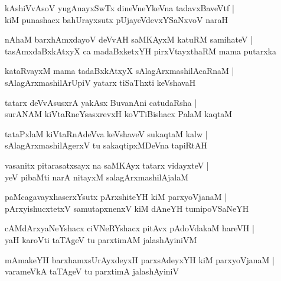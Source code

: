 \documentclass[twoside,12pt,openright]{book}
\newcounter{shloka}[chapter]
\begin{document}
\begin{shloka}%
kAshiVvAsoV yugAnayxSwTx dineVneYkeVna tadavxBaveVtf |\\
kiM punashacx bahUrayxsutx pUjayeVdevxYSaNxvoV naraH 
\end{shloka}

\begin{shloka}%
nAhaM barxhAmxdayoV deVvAH saMKAyxM katuRM samihateV |\\
tasAmxdaBxkAtxyX ca madaBxketxYH pirxVtayxthaRM mama putarxka
\end{shloka}

\begin{shloka}%
kataRvayxM mama tadaBxkAtxyX sAlagArxmashilAcaRnaM |\\
sAlagArxmashilArUpiV yatarx tiSaThxti keVshavaH 
\end{shloka}

\begin{shloka}%
tatarx deVvAsusxrA yakAsx BuvanAni catudaRsha |\\
surANAM kiVtaRneYsasxrevxH koVTiBishacx PalaM kaqtaM 
\end{shloka}

\begin{shloka}%
tataPxlaM kiVtaRnAdeVva keVshaveV sukaqtaM kalw |\\
sAlagArxmashilAgerxV tu sakaqtipxMDeVna tapiRtAH 
\end{shloka}

\begin{shloka}%
vasanitx pitarasatxsayx na saMKAyx tatarx vidayxteV |\\
yeV pibaMti narA nitayxM salagArxmashilAjalaM 
\end{shloka}

\begin{shloka}%
paMcagavayxhaserxYsutx pArxshiteYH kiM parxyoVjanaM |\\
pArxyishucxtetxV samutapxnenxV kiM dAneYH tumipoVSaNeYH
\end{shloka}

\begin{shloka}%
cAMdArxyaNeYshacx ciVNeRYshacx pitAvx pAdoVdakaM hareVH |\\
yaH karoVti taTAgeV tu parxtimAM jalashAyiniVM 
\end{shloka}

\begin{shloka}%
mAmakeYH barxhamxsUrAyxdeyxH parxsAdeyxYH kiM parxyoVjanaM |\\
varameVkA taTAgeV tu parxtimA jalashAyiniV 
\end{shloka}
\end{document}
